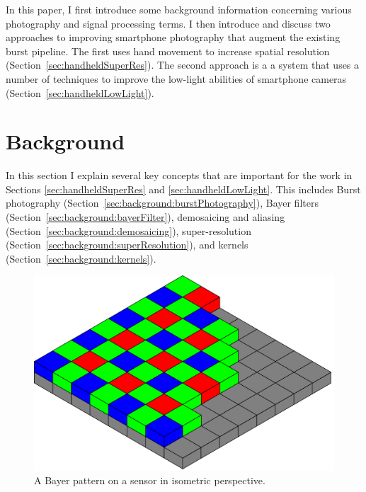 \documentclass{sig-alternate}
\begin{document}
In this paper, I first introduce some background information concerning various photography and signal processing terms. I then introduce and discuss two approaches to improving smartphone photography that augment the existing burst pipeline. The first uses hand movement to increase spatial resolution (Section~\ref{sec:handheldSuperRes}). The second approach is a a system that uses a number of techniques to improve the low-light abilities of smartphone cameras (Section~\ref{sec:handheldLowLight}).

\section{Background}
\label{sec:background}

In this section I explain several key concepts that are important for the work in Sections \ref{sec:handheldSuperRes} and \ref{sec:handheldLowLight}. This includes Burst photography (Section~\ref{sec:background:burstPhotography}), Bayer filters (Section~\ref{sec:background:bayerFilter}), demosaicing and aliasing (Section~\ref{sec:background:demosaicing}), super-resolution (Section~\ref{sec:background:superResolution}), and kernels (Section~\ref{sec:background:kernels}).

\begin{figure}
\centering
\includegraphics[width=\columnwidth]{20190404183627!Bayer_pattern_on_sensor}
\caption{A Bayer pattern on a sensor in isometric perspective.~\cite{wiki:BayerFilter}}
\label{fig:BayerPattern}
\end{figure}
\end{document}
